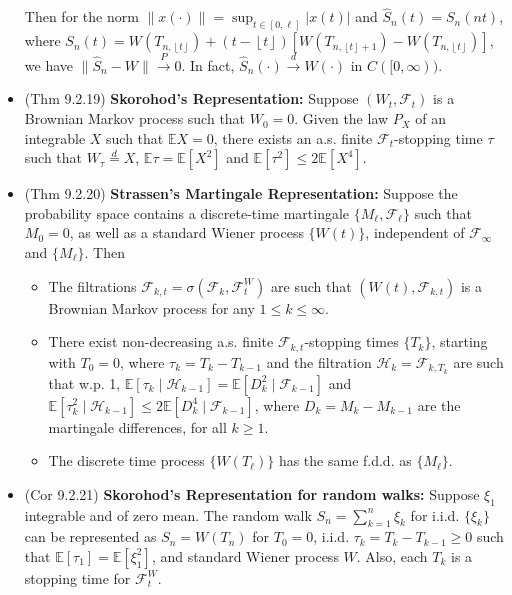 \documentclass[twoside]{article}
\newcommand{\dis}{\displaystyle}
\def\lf{\left\lfloor}
\def\rf{\right\rfloor}
\newcommand\bbE{\mathbb{E}}
\newcommand\calF{\mathcal{F}}
\newcommand\calH{\mathcal{H}}
\newcommand\sg{\sigma}
\newcommand\goesto{\rightarrow}
\begin{document}
\begin{itemize}
Then for the norm $\|x(\cdot)\| = \dis\sup_{t \in [0,\ell]} |x(t)|$ and $\widehat{S}_n(t) = S_n(nt)$, where $S_n(t) = W(T_{n, \lf t \rf}) + (t - \lf t \rf)[W(T_{n, \lf t \rf + 1}) - W(T_{n, \lf t \rf})]$, we have $\| \hat{S}_n - W \| \stackrel{P}{\goesto} 0$. In fact, $\hat{S}_n(\cdot) \stackrel{d}{\goesto} W(\cdot)$ in $C([0,\infty))$.

\item (Thm 9.2.19) \textbf{Skorohod's Representation:} Suppose $(W_t, \calF_t)$ is a Brownian Markov process such that $W_0 = 0$. Given the law $P_X$ of an integrable $X$ such that $\bbE X = 0$, there exists an a.s. finite $\calF_t$-stopping time $\tau$ such that $W_\tau \stackrel{d}{=} X$, $\bbE \tau = \bbE [X^2]$ and $\bbE [\tau^2] \leq 2 \bbE [X^4]$.

\item (Thm 9.2.20) \textbf{Strassen's Martingale Representation:} Suppose the probability space contains a discrete-time martingale $\{M_{\ell}, \calF_\ell\}$ such that $M_0 = 0$, as well as a standard Wiener process $\{W(t)\}$, independent of $\calF_\infty$ and $\{M_\ell\}$. Then
\begin{itemize}
\item The filtrations $\calF_{k,t} = \sg(\calF_k, \calF_t^W)$ are such that $(W(t), \calF_{k,t})$ is a Brownian Markov process for any $1 \leq k \leq \infty$.

\item There exist non-decreasing a.s. finite $\calF_{k,t}$-stopping times $\{T_k\}$, starting with $T_0 = 0$, where $\tau_k = T_k - T_{k-1}$ and the filtration $\calH_k = \calF_{k, T_k}$ are such that w.p. 1, $\bbE[\tau_k \mid \calH_{k-1}] = \bbE [D_k^2 \mid \calF_{k-1}]$ and $\bbE[\tau_k^2 \mid \calH_{k-1}] \leq 2\bbE [D_k^4 \mid \calF_{k-1}]$, where $D_k = M_k - M_{k-1}$ are the martingale differences, for all $k \geq 1$.
\item The discrete time process $\{ W(T_\ell)\}$ has the same f.d.d. as $\{ M_\ell\}$.
\end{itemize}

\item (Cor 9.2.21) \textbf{Skorohod's Representation for random walks:} Suppose $\xi_1$ integrable and of zero mean. The random walk $S_n = \sum_{k=1}^n \xi_k$ for i.i.d. $\{\xi_k\}$ can be represented as $S_n = W(T_n)$ for $T_0 = 0$, i.i.d. $\tau_k = T_k - T_{k-1} \geq 0$ such that $\bbE [\tau_1] = \bbE [\xi_1^2]$, and standard Wiener process $W$. Also, each $T_k$ is a stopping time for $\calF_t^W$.


\end{itemize}
\end{document}
